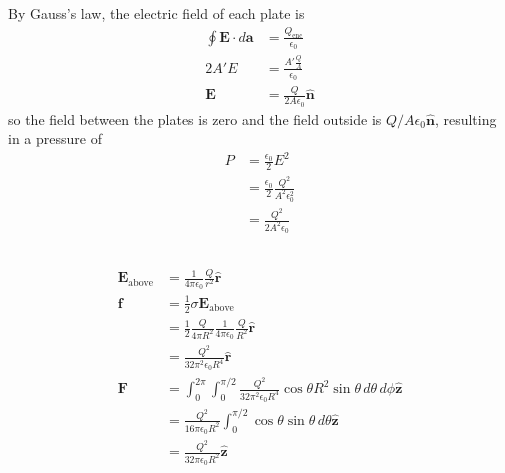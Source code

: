 \documentclass{article}
\renewcommand{\vec}[1]{\boldsymbol{\mathbf{#1}}}
\newcommand{\uvec}[1]{\hat{\vec{#1}}}
\newcommand{\ke}{\frac{1}{4 \pi \epsilon_0}}
\begin{document}
By Gauss's law, the electric field of each plate is \begin{align*}
  \oint \vec{E} \cdot d \vec{a} & = \frac{Q_\text{enc}}{\epsilon_0}   \\
  2 A' E                        & = \frac{A' \frac{Q}{A}}{\epsilon_0} \\
  \vec{E}                       & = \frac{Q}{2 A \epsilon_0} \uvec{n}
\end{align*} so the field between the plates is zero and the field outside is $Q / A \epsilon_0 \uvec{n}$, resulting in a pressure of \begin{align*}
  P & = \frac{\epsilon_0}{2} E^2                          \\
    & = \frac{\epsilon_0}{2} \frac{Q^2}{A^2 \epsilon_0^2} \\
    & = \frac{Q^2}{2 A^2 \epsilon_0}
\end{align*}

\subsection{}

\begin{align*}
  \vec{E}_\text{above} & = \ke \frac{Q}{r^2} \uvec{r}                                                                                                   \\
  \vec{f}              & = \frac{1}{2} \sigma \vec{E}_\text{above}                                                                                      \\
                       & = \frac{1}{2} \frac{Q}{4 \pi R^2} \ke \frac{Q}{R^2} \uvec{r}                                                                   \\
                       & = \frac{Q^2}{32 \pi^2 \epsilon_0 R^4} \uvec{r}                                                                                 \\
  \vec{F}              & = \int_0^{2 \pi} \int_0^{\pi / 2} \frac{Q^2}{32 \pi^2 \epsilon_0 R^4} \cos \theta R^2 \sin \theta \,d \theta \,d \phi \uvec{z} \\
                       & = \frac{Q^2}{16 \pi \epsilon_0 R^2} \int_0^{\pi / 2} \cos \theta \sin \theta \,d \theta \uvec{z}                               \\
                       & = \frac{Q^2}{32 \pi \epsilon_0 R^2} \uvec{z}
\end{align*}

\subsection{}
\end{document}
